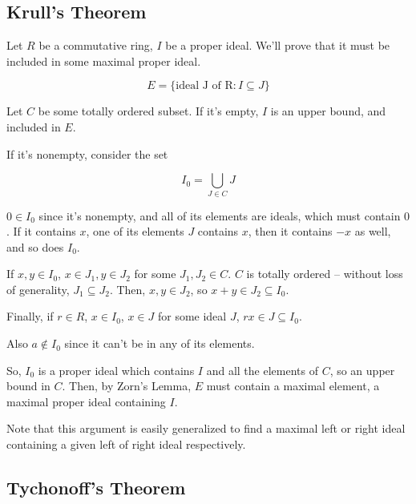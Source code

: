 \documentclass{article}
\begin{document}
      \subsection{Krull's Theorem}

        Let $R$ be a commutative ring, $I$ be a proper ideal. We'll prove that
        it must be included in some maximal proper ideal.

        \[E = \{\text{ideal J of R} : I \subseteq J\}\]

        Let $C$ be some totally ordered subset. If it's empty, $I$ is an upper
        bound, and included in $E$.

        If it's nonempty, consider the set

        \[I_0 = \bigcup_{J \in C} J\]

        $0 \in I_0$ since it's nonempty, and all of its elements are ideals,
        which must contain $0$. If it contains $x$, one of its elements $J$
        contains $x$, then it contains $-x$ as well, and so does $I_0$.

        If $x, y \in I_0$, $x \in J_1, y  \in J_2$ for some $J_1, J_2 \in C$.
        $C$ is totally ordered -- without loss of generality, $J_1 \subseteq
        J_2$. Then, $x, y \in J_2$, so $x + y \in J_2 \subseteq I_0$.

        Finally, if $r \in R$, $x \in I_0$, $x \in J$ for some ideal $J$, $rx
        \in J \subseteq I_0$.

        Also $a \notin I_0$ since it can't be in any of its elements.

        So, $I_0$ is a proper ideal which contains $I$ and all the elements of
        $C$, so an upper bound in $C$. Then, by Zorn's Lemma, $E$ must contain a
        maximal element, a maximal proper ideal containing $I$.

        Note that this argument is easily generalized to find a maximal left
        or right ideal containing a given left of right ideal respectively.

      \subsection{Tychonoff's Theorem}

        


      

  
\end{document}
